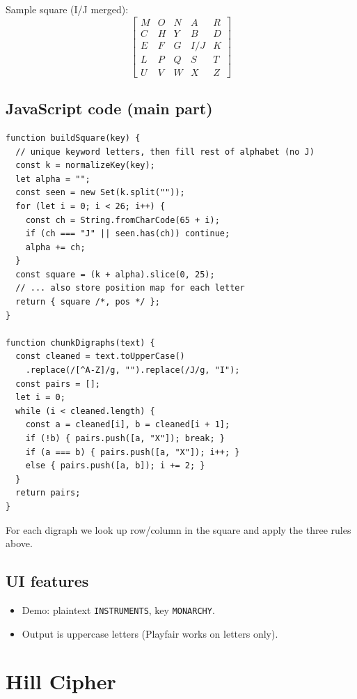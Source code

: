 \documentclass[12pt,a4paper]{article}
\begin{document}
Sample square (I/J merged):
\[
\begin{bmatrix}
M & O & N & A & R \\
C & H & Y & B & D \\
E & F & G & I/J & K \\
L & P & Q & S & T \\
U & V & W & X & Z
\end{bmatrix}
\]

\subsection{JavaScript code (main part)}
\begin{lstlisting}
function buildSquare(key) {
  // unique keyword letters, then fill rest of alphabet (no J)
  const k = normalizeKey(key);
  let alpha = "";
  const seen = new Set(k.split(""));
  for (let i = 0; i < 26; i++) {
    const ch = String.fromCharCode(65 + i);
    if (ch === "J" || seen.has(ch)) continue;
    alpha += ch;
  }
  const square = (k + alpha).slice(0, 25);
  // ... also store position map for each letter
  return { square /*, pos */ };
}

function chunkDigraphs(text) {
  const cleaned = text.toUpperCase()
    .replace(/[^A-Z]/g, "").replace(/J/g, "I");
  const pairs = [];
  let i = 0;
  while (i < cleaned.length) {
    const a = cleaned[i], b = cleaned[i + 1];
    if (!b) { pairs.push([a, "X"]); break; }
    if (a === b) { pairs.push([a, "X"]); i++; }
    else { pairs.push([a, b]); i += 2; }
  }
  return pairs;
}
\end{lstlisting}

For each digraph we look up row/column in the square and apply the three rules above.

\subsection{UI features}
\begin{itemize}[leftmargin=*]
  \item Demo: plaintext \texttt{INSTRUMENTS}, key \texttt{MONARCHY}.
  \item Output is uppercase letters (Playfair works on letters only).
\end{itemize}

\section{Hill Cipher}
\end{document}
